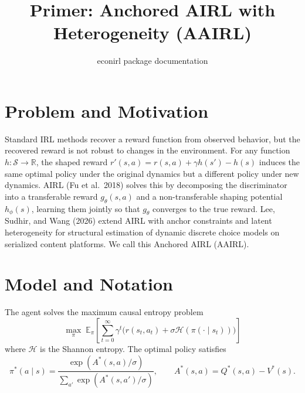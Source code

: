 \documentclass[11pt]{article}
\title{Primer: Anchored AIRL with Heterogeneity (AAIRL)}
\author{econirl package documentation}
\date{}
\newcommand{\E}{\mathbb{E}}
\newcommand{\R}{\mathbb{R}}
\newcommand{\calS}{\mathcal{S}}
\newcommand{\calH}{\mathcal{H}}
\begin{document}
\maketitle

\section{Problem and Motivation}

Standard IRL methods recover a reward function from observed behavior, but the recovered reward is not robust to changes in the environment. For any function $h : \calS \to \R$, the shaped reward $r'(s,a) = r(s,a) + \gamma h(s') - h(s)$ induces the same optimal policy under the original dynamics but a different policy under new dynamics. AIRL (Fu et al.\ 2018) solves this by decomposing the discriminator into a transferable reward $g_\theta(s,a)$ and a non-transferable shaping potential $h_\phi(s)$, learning them jointly so that $g_\theta$ converges to the true reward. Lee, Sudhir, and Wang (2026) extend AIRL with anchor constraints and latent heterogeneity for structural estimation of dynamic discrete choice models on serialized content platforms. We call this Anchored AIRL (AAIRL).

\section{Model and Notation}

The agent solves the maximum causal entropy problem
\begin{equation}
\label{eq:objective}
\max_\pi \; \E_\pi\!\left[\sum_{t=0}^{\infty} \gamma^t \big(r(s_t, a_t) + \sigma \calH(\pi(\cdot \mid s_t))\big)\right]
\end{equation}
where $\calH$ is the Shannon entropy. The optimal policy satisfies
\begin{equation}
\label{eq:softmax}
\pi^*(a \mid s) = \frac{\exp(A^*(s,a)/\sigma)}{\sum_{a'} \exp(A^*(s,a')/\sigma)}, \qquad A^*(s,a) = Q^*(s,a) - V^*(s).
\end{equation}
\end{document}
